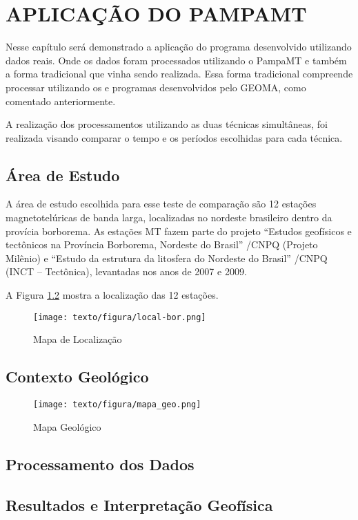 \chapter{APLICAÇÃO DO PAMPAMT}
    
    Nesse capítulo será demonstrado a aplicação do programa desenvolvido utilizando dados reais. Onde os dados foram processados utilizando o PampaMT e também a forma tradicional que vinha sendo realizada. Essa forma tradicional compreende processar utilizando os  e programas desenvolvidos pelo GEOMA, como comentado anteriormente.
    
    A realização dos processamentos utilizando as duas técnicas simultâneas, foi realizada visando comparar o tempo e os períodos escolhidas para cada técnica.  
    
    \section{Área de Estudo}
        
        A área de estudo escolhida para esse teste de comparação são 12 estações magnetotelúricas de banda larga, localizadas no nordeste brasileiro dentro da provícia borborema. As estações MT fazem parte do projeto ``Estudos geofísicos e tectônicos na Província Borborema, Nordeste do Brasil” /CNPQ (Projeto Milênio) e “Estudo da estrutura da litosfera do Nordeste do Brasil” /CNPQ (INCT – Tectônica), levantadas nos anos de 2007 e 2009.
        
        A Figura \ref{local-bor} mostra a localização das 12 estações.
        
    \begin{figure}[H]
        \caption{Mapa de Localização}
            \begin{center}
                \texttt{[image: texto/figura/local-bor.png]}
            \end{center}
        \label{local-bor}
    \end{figure}        
        
    \section{Contexto Geológico}
    
    \begin{figure}[H]
        \caption{Mapa Geológico}
            \begin{center}
                \texttt{[image: texto/figura/mapa\_geo.png]}
            \end{center}
        \label{local-bor}
    \end{figure}
        
    \section{Processamento dos Dados}
        
    \section{Resultados e Interpretação Geofísica}
        
        
